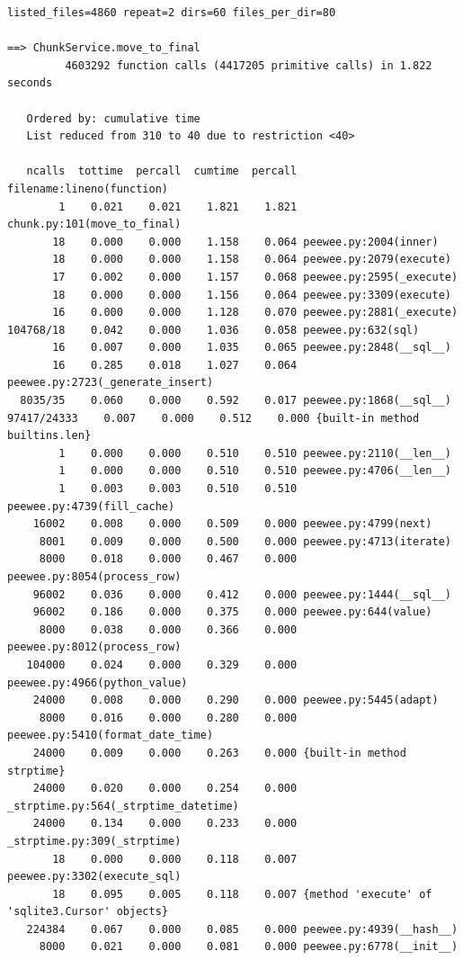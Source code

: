 \documentclass[a4paper,12pt]{article}
\begin{document}
\begin{lstlisting}[basicstyle=\ttfamily\fontsize{9}{9}\selectfont]
listed_files=4860 repeat=2 dirs=60 files_per_dir=80

==> ChunkService.move_to_final
         4603292 function calls (4417205 primitive calls) in 1.822 seconds

   Ordered by: cumulative time
   List reduced from 310 to 40 due to restriction <40>

   ncalls  tottime  percall  cumtime  percall filename:lineno(function)
        1    0.021    0.021    1.821    1.821 chunk.py:101(move_to_final)
       18    0.000    0.000    1.158    0.064 peewee.py:2004(inner)
       18    0.000    0.000    1.158    0.064 peewee.py:2079(execute)
       17    0.002    0.000    1.157    0.068 peewee.py:2595(_execute)
       18    0.000    0.000    1.156    0.064 peewee.py:3309(execute)
       16    0.000    0.000    1.128    0.070 peewee.py:2881(_execute)
104768/18    0.042    0.000    1.036    0.058 peewee.py:632(sql)
       16    0.007    0.000    1.035    0.065 peewee.py:2848(__sql__)
       16    0.285    0.018    1.027    0.064 peewee.py:2723(_generate_insert)
  8035/35    0.060    0.000    0.592    0.017 peewee.py:1868(__sql__)
97417/24333    0.007    0.000    0.512    0.000 {built-in method builtins.len}
        1    0.000    0.000    0.510    0.510 peewee.py:2110(__len__)
        1    0.000    0.000    0.510    0.510 peewee.py:4706(__len__)
        1    0.003    0.003    0.510    0.510 peewee.py:4739(fill_cache)
    16002    0.008    0.000    0.509    0.000 peewee.py:4799(next)
     8001    0.009    0.000    0.500    0.000 peewee.py:4713(iterate)
     8000    0.018    0.000    0.467    0.000 peewee.py:8054(process_row)
    96002    0.036    0.000    0.412    0.000 peewee.py:1444(__sql__)
    96002    0.186    0.000    0.375    0.000 peewee.py:644(value)
     8000    0.038    0.000    0.366    0.000 peewee.py:8012(process_row)
   104000    0.024    0.000    0.329    0.000 peewee.py:4966(python_value)
    24000    0.008    0.000    0.290    0.000 peewee.py:5445(adapt)
     8000    0.016    0.000    0.280    0.000 peewee.py:5410(format_date_time)
    24000    0.009    0.000    0.263    0.000 {built-in method strptime}
    24000    0.020    0.000    0.254    0.000 _strptime.py:564(_strptime_datetime)
    24000    0.134    0.000    0.233    0.000 _strptime.py:309(_strptime)
       18    0.000    0.000    0.118    0.007 peewee.py:3302(execute_sql)
       18    0.095    0.005    0.118    0.007 {method 'execute' of 'sqlite3.Cursor' objects}
   224384    0.067    0.000    0.085    0.000 peewee.py:4939(__hash__)
     8000    0.021    0.000    0.081    0.000 peewee.py:6778(__init__)

\end{lstlisting}
\end{document}
